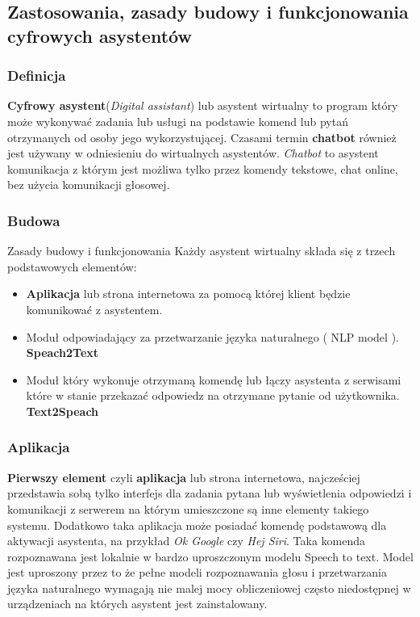 \subsection{Zastosowania, zasady budowy i funkcjonowania cyfrowych asystentów}

\subsubsection{Definicja}

\textbf{Cyfrowy asystent}(\textit{Digital assistant}) lub asystent wirtualny to program który może wykonywać zadania lub usługi na podstawie komend lub pytań otrzymanych od osoby jego wykorzystującej. Czasami termin \textbf{chatbot} również jest używany w odniesieniu do wirtualnych asystentów. \textit{Chatbot} to asystent komunikacja z którym jest możliwa tylko przez komendy tekstowe, chat online, bez użycia komunikacji głosowej. \\

\subsubsection{Budowa}

Zasady budowy i funkcjonowania Każdy asystent wirtualny składa się z trzech podstawowych elementów: 

\begin{itemize}
	\item \textbf{Aplikacja} lub strona internetowa za pomocą której klient będzie komunikować z asystentem. 
	\item Moduł odpowiadający za przetwarzanie języka naturalnego ( NLP model ). \textbf{Speach2Text}
	\item Moduł który wykonuje otrzymaną komendę lub łączy asystenta z serwisami które w stanie przekazać odpowiedz na otrzymane pytanie od użytkownika. \textbf{Text2Speach} \\
\end{itemize}

\subsubsection{Aplikacja}

\textbf{Pierwszy element} czyli \textbf{aplikacja} lub strona internetowa, najcześciej przedstawia sobą tylko interfejs dla zadania pytana lub wyświetlenia odpowiedzi i komunikacji z serwerem na którym umieszczone są inne elementy takiego systemu. Dodatkowo taka aplikacja może posiadać komendę podstawową dla aktywacji asystenta, na przykład \textit{Ok Google} czy \textit{Hej Siri}. Taka komenda rozpoznawana jest lokalnie w bardzo uproszczonym modelu Speech to text. Model jest uproszony przez to że pełne modeli rozpoznawania głosu i przetwarzania języka naturalnego wymagają nie malej mocy obliczeniowej często niedostępnej w urządzeniach na których asystent jest zainstalowany. \\

